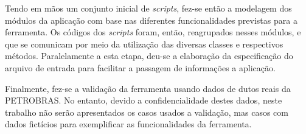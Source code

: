 Tendo em mãos um conjunto inicial de \textit{scripts}, fez-se então a modelagem dos módulos da aplicação com base nas diferentes funcionalidades previstas para a ferramenta.
Os códigos dos \textit{scripts} foram, então, reagrupados nesses módulos, e que se comunicam por meio da utilização das diversas classes e respectivos métodos.
Paralelamente a esta etapa, deu-se a elaboração da especificação do arquivo de entrada para facilitar a passagem de informações a aplicação.

Finalmente, fez-se a validação da ferramenta usando dados de dutos reais da PETROBRAS.
No entanto, devido a confidencialidade destes dados, neste trabalho não serão apresentados os casos usados a validação, mas casos com dados fictícios para exemplificar as funcionalidades da ferramenta.